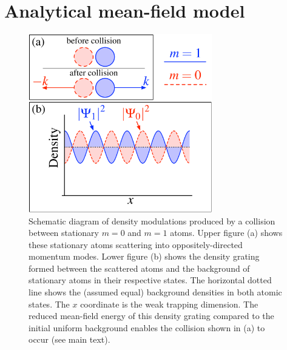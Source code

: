 \section{Analytical mean-field model}


\begin{figure}
    \begin{center}
        \includegraphics[width=8cm]{CollisionDiagram}
        \caption{Schematic diagram of density modulations produced by a collision
                 between stationary $m=0$ and $m=1$ atoms. Upper figure (a)
                 shows these stationary atoms scattering into oppositely-directed
                 momentum modes. Lower figure (b) shows the density grating formed
                 between the scattered atoms and the background of stationary atoms
                 in their respective states. The horizontal dotted line shows the
                 (assumed equal) background densities in both atomic states. The $x$
                 coordinate is the weak trapping dimension. The reduced mean-field
                 energy of this density grating compared to the initial uniform
                 background enables the collision shown in (a) to occur (see main
                 text).
                 \label{Peaks:CollisionDiagram}}
    \end{center}
\end{figure}

